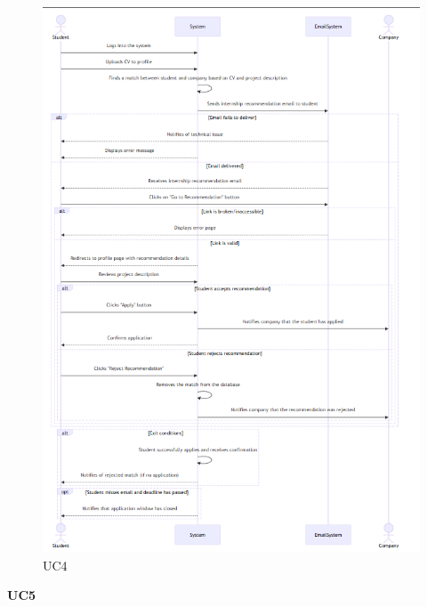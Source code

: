 \begin{figure}[H]
    \centering
    \includegraphics[width=0.8\linewidth]{RASD//Images/UC4.png}
    \caption{UC4}
\end{figure}

\pagebreak
\textbf{UC5}

